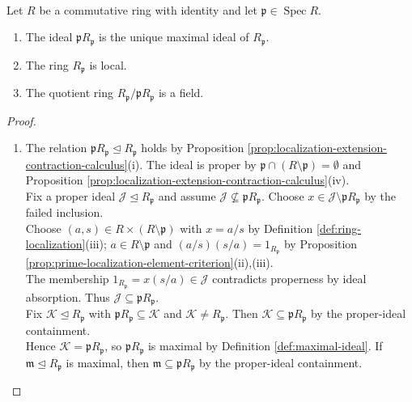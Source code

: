 \begin{theorem} \label{thm:prime-localization-is-local} \\
Let $R$ be a commutative ring with identity and let $\mathfrak{p}\in\operatorname{Spec}R$.
\begin{enumerate}[label=(\roman*)]
\setlength{\itemsep}{0pt}
\item The ideal $\mathfrak{p}R_{\mathfrak{p}}$ is the unique maximal ideal of $R_{\mathfrak{p}}$.
\item The ring $R_{\mathfrak{p}}$ is local.
\item The quotient ring $R_{\mathfrak{p}}/\mathfrak{p}R_{\mathfrak{p}}$ is a field.
\end{enumerate}
\begin{proof}
\begin{enumerate}[label=(\roman*)]
\setlength{\itemsep}{0pt}
\item The relation $\mathfrak{p}R_{\mathfrak{p}}\trianglelefteq R_{\mathfrak{p}}$ holds by Proposition \ref{prop:localization-extension-contraction-calculus}(i). The ideal is proper by $\mathfrak{p}\cap(R\setminus\mathfrak{p})=\emptyset$ and Proposition \ref{prop:localization-extension-contraction-calculus}(iv).\\
Fix a proper ideal $\mathcal{J}\trianglelefteq R_{\mathfrak{p}}$ and assume $\mathcal{J}\nsubseteq\mathfrak{p}R_{\mathfrak{p}}$. Choose $x\in\mathcal{J}\setminus\mathfrak{p}R_{\mathfrak{p}}$ by the failed inclusion.\\
Choose $(a,s)\in R\times(R\setminus\mathfrak{p})$ with $x=a/s$ by Definition \ref{def:ring-localization}(iii); $a\in R\setminus\mathfrak{p}$ and $(a/s)(s/a)=1_{R_{\mathfrak{p}}}$ by Proposition \ref{prop:prime-localization-element-criterion}(ii),(iii).\\
The membership $1_{R_{\mathfrak{p}}}=x(s/a)\in\mathcal{J}$ contradicts properness by ideal absorption. Thus $\mathcal{J}\subseteq\mathfrak{p}R_{\mathfrak{p}}$.\\
Fix $\mathcal{K}\trianglelefteq R_{\mathfrak{p}}$ with $\mathfrak{p}R_{\mathfrak{p}}\subseteq\mathcal{K}$ and $\mathcal{K}\neq R_{\mathfrak{p}}$. Then $\mathcal{K}\subseteq\mathfrak{p}R_{\mathfrak{p}}$ by the proper-ideal containment.\\
Hence $\mathcal{K}=\mathfrak{p}R_{\mathfrak{p}}$, so $\mathfrak{p}R_{\mathfrak{p}}$ is maximal by Definition \ref{def:maximal-ideal}. If $\mathfrak{m}\trianglelefteq R_{\mathfrak{p}}$ is maximal, then $\mathfrak{m}\subseteq\mathfrak{p}R_{\mathfrak{p}}$ by the proper-ideal containment.\\

\end{enumerate}
\end{proof}
\end{theorem}

